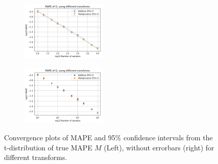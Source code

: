 \begin{figure}[!htb]
\begin{center}
\begin{subfigure}
    \centering
    \includegraphics[width=0.45\textwidth]{Chap6_EvaluationAndAnalysis/transform_variation/Stderr_convergence_KR6_transforms.png}
\end{subfigure}
\begin{subfigure}
    \centering
    \includegraphics[width=0.45\textwidth]{Chap6_EvaluationAndAnalysis/transform_variation/MAPE_convergence_KR6_transforms.png}
\end{subfigure}
\caption{Convergence plots of MAPE and 95\% confidence intervals from the t-distribution of true MAPE \(M\) (Left), without errorbars (right) for different transforms. }
\label{fig:Convergence_Transforms}
\end{center}
\end{figure}

